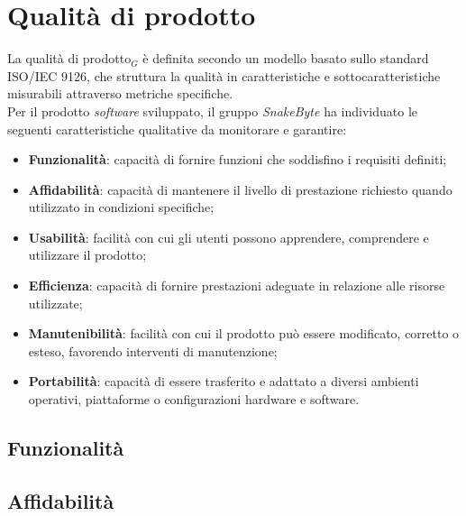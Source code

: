 \documentclass[10pt, letterpaper]{article}
\begin{document}
\section{Qualità di prodotto}
La qualità di prodotto$_G$ è definita secondo un modello basato sullo standard
ISO/IEC 9126, che struttura la qualità in caratteristiche e sottocaratteristiche
misurabili attraverso metriche specifiche.
\\Per il prodotto \textit{software} sviluppato, il gruppo \textit{SnakeByte}
ha individuato le seguenti caratteristiche qualitative da monitorare e garantire:
\begin{itemize}
    \item \textbf{Funzionalità}: capacità di fornire funzioni che soddisfino
          i requisiti definiti;
    \item \textbf{Affidabilità}: capacità di mantenere il livello di prestazione
          richiesto quando utilizzato in condizioni specifiche;
    \item \textbf{Usabilità}: facilità con cui gli utenti possono apprendere,
          comprendere e utilizzare il prodotto;
    \item \textbf{Efficienza}: capacità di fornire prestazioni adeguate in
          relazione alle risorse utilizzate;
    \item \textbf{Manutenibilità}: facilità con cui il prodotto può essere
          modificato, corretto o esteso, favorendo interventi di manutenzione;
    \item \textbf{Portabilità}: capacità di essere trasferito e adattato a
          diversi ambienti operativi, piattaforme o configurazioni hardware e software.
\end{itemize}

\subsection{Funzionalità}
\begin{table}[H]
    \caption{Tabella dei valori soglia per metriche di funzionalità}
\end{table}

\begin{table}[H]
    \subsection{Affidabilità}
    \caption{Tabella dei valori soglia per metriche di affidabilità}
\end{table}
\end{document}
